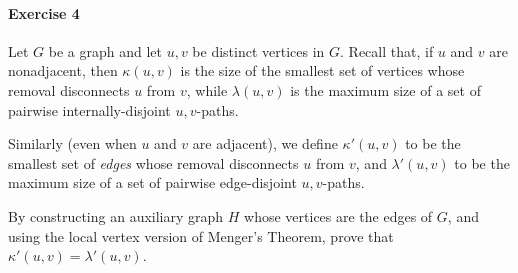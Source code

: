 \documentclass[a4paper,12pt]{article}
\begin{document}
\paragraph{Exercise 4}   Let $G$ be a graph and let $u, v$ be distinct vertices in $G$. Recall that, if $u$ and $v$ are nonadjacent, then $\kappa(u,v)$ is the size of the smallest set of vertices whose removal disconnects $u$ from $v$, while $\lambda(u,v)$ is the maximum size of a set of pairwise internally-disjoint $u,v$-paths.

Similarly (even when $u$ and $v$ are adjacent), we define $\kappa'(u,v)$ to be the smallest set of \emph{edges} whose removal disconnects $u$ from $v$, and $\lambda'(u,v)$ to be the maximum size of a set of pairwise edge-disjoint $u,v$-paths.

By constructing an auxiliary graph $H$ whose vertices are the edges of $G$, and using the local vertex version of Menger's Theorem, prove that $\kappa'(u,v) = \lambda'(u,v)$.





\begin{center}
\end{center}
\end{document}
